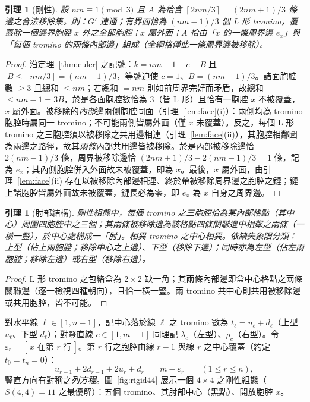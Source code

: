 \documentclass[11pt]{ctexart}
\newtheorem{lemma}[theorem]{引理}
\theoremstyle{definition}
\newcommand{\ceil}[1]{\left\lceil #1 \right\rceil}
\newcommand{\floor}[1]{\left\lfloor #1 \right\rfloor}
\begin{document}
\begin{lemma}[剛性]\label{lem:rigid}
設 $nm\equiv 1\pmod 3$ 且 $A$ 為恰含 $\ceil{2nm/3}=(2nm+1)/3$ 條邊之合法移除集。則：$G'$ 連通；有界面恰為 $(nm-1)/3$ 個 L 形 tromino，覆蓋除一個邊界胞腔 $x$ 外之全部胞腔；$x$ 屬外面；$A$ 恰由「$x$ 的一條周界邊 $e_x$」與「每個 tromino 的兩條內部邊」組成（全網格僅此一條周界邊被移除）。
\end{lemma}

\begin{proof}
沿定理~\ref{thm:euler} 之記號：$k=nm-1+c-B\;$且$\;B\le\floor{nm/3}=(nm-1)/3$，等號迫使 $c=1$、$B=(nm-1)/3$。諸面胞腔數 $\ge3$ 且總和 $\le nm$；若總和 $=nm$ 則如前周界完好而矛盾，故總和 $\le nm-1=3B$，於是各面胞腔數恰為 $3$（皆 L 形）且恰有一胞腔 $x$ 不被覆蓋，$x$ 屬外面。被移除的\emph{內部}邊兩側胞腔同面（引理~\ref{lem:face}(i)）：兩側均為 tromino 胞腔時屬同一 tromino；不可能兩側皆屬外面（僅 $x$ 未覆蓋）。反之，每個 L 形 tromino 之三胞腔須以被移除之共用邊相連（引理~\ref{lem:face}(ii)），其胞腔相鄰圖為兩邊之路徑，故其\emph{兩條}內部共用邊皆被移除。於是內部被移除邊恰 $2(nm-1)/3$ 條，周界被移除邊恰 $(2nm+1)/3-2(nm-1)/3=1$ 條，記為 $e_x$；其內側胞腔併入外面故未被覆蓋，即為 $x$。最後，$x$ 屬外面，由引理~\ref{lem:face}(ii) 存在以被移除內部邊相連、終於帶被移除周界邊之胞腔之鏈；鏈上諸胞腔皆屬外面故未被覆蓋，鏈長必為零，即 $e_x$ 為 $x$ 自身之周界邊。
\end{proof}

\begin{lemma}[肘部結構]\label{lem:elbow}
剛性組態中，每個 tromino 之三胞腔恰為某內部格點（其\emph{中心}）周圍四胞腔中之三個；其兩條被移除邊為該格點四條關聯邊中相鄰之兩條（一橫一豎），於中心處構成一「肘」。相異 tromino 之中心相異。依缺失象限分類：\emph{上型}（佔上兩胞腔；移除中心之上邊）、\emph{下型}（移除下邊）；同時亦為\emph{左型}（佔左兩胞腔；移除左邊）或\emph{右型}（移除右邊）。
\end{lemma}

\begin{proof}
L 形 tromino 之包絡盒為 $2\times2$ 缺一角；其兩條內部邊即盒中心格點之兩條關聯邊（逐一檢視四種朝向），且恰一橫一豎。兩 tromino 共中心則共用被移除邊或共用胞腔，皆不可能。
\end{proof}

對水平線 $\ell\in[1,n-1]$，記中心落於線 $\ell$ 之 tromino 數為 $t_\ell=u_\ell+d_\ell$（上型 $u_\ell$、下型 $d_\ell$）；對豎直線 $c\in[1,m-1]$ 同理記 $\lambda_c$（左型）、$\rho_c$（右型）。令 $\varepsilon_r=[\,x\text{ 在第 }r\text{ 行}\,]$。第 $r$ 行之胞腔由線 $r{-}1$ 與線 $r$ 之中心覆蓋（約定 $t_0=t_n=0$）：
\begin{equation}\label{eq:row}
u_{r-1}+2d_{r-1}+2u_r+d_r \;=\; m-\varepsilon_r\qquad(1\le r\le n),
\end{equation}
豎直方向有對稱之\emph{列方程}。圖~\ref{fig:rigid44} 展示一個 $4\times4$ 之剛性組態（$S(4,4)=11$ 之最優解）：五個 tromino、其肘部中心（黑點）、開放胞腔 $x$。
\end{document}
